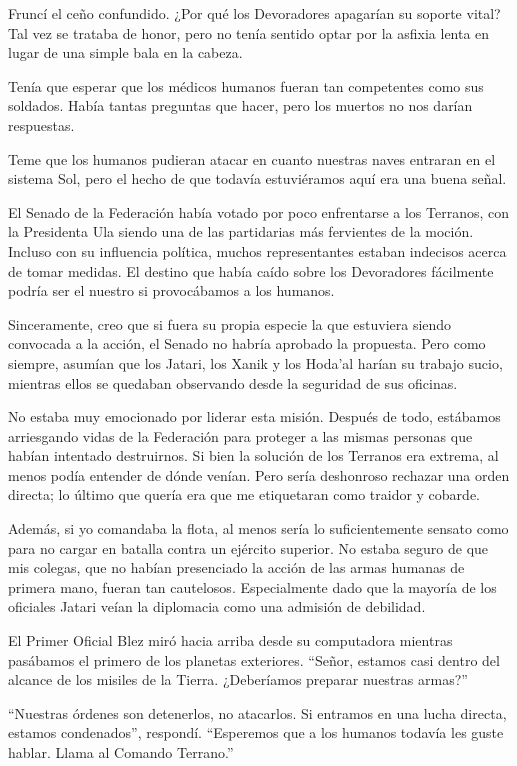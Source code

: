 \documentclass[spanish,12pt,a4paper,oneside,titlepage]{book}
\begin{document}
    Fruncí el ceño confundido. ¿Por qué los Devoradores apagarían su soporte vital? Tal vez se trataba de honor, pero no tenía sentido optar por la asfixia lenta en lugar de una simple bala en la cabeza.

    Tenía que esperar que los médicos humanos fueran tan competentes como sus soldados. Había tantas preguntas que hacer, pero los muertos no nos darían respuestas.

    Teme que los humanos pudieran atacar en cuanto nuestras naves entraran en el sistema Sol, pero el hecho de que todavía estuviéramos aquí era una buena señal.

    El Senado de la Federación había votado por poco enfrentarse a los Terranos, con la Presidenta Ula siendo una de las partidarias más fervientes de la moción. Incluso con su influencia política, muchos representantes estaban indecisos acerca de tomar medidas. El destino que había caído sobre los Devoradores fácilmente podría ser el nuestro si provocábamos a los humanos.

    Sinceramente, creo que si fuera su propia especie la que estuviera siendo convocada a la acción, el Senado no habría aprobado la propuesta. Pero como siempre, asumían que los Jatari, los Xanik y los Hoda’al harían su trabajo sucio, mientras ellos se quedaban observando desde la seguridad de sus oficinas.

    No estaba muy emocionado por liderar esta misión. Después de todo, estábamos arriesgando vidas de la Federación para proteger a las mismas personas que habían intentado destruirnos. Si bien la solución de los Terranos era extrema, al menos podía entender de dónde venían. Pero sería deshonroso rechazar una orden directa; lo último que quería era que me etiquetaran como traidor y cobarde.

    Además, si yo comandaba la flota, al menos sería lo suficientemente sensato como para no cargar en batalla contra un ejército superior. No estaba seguro de que mis colegas, que no habían presenciado la acción de las armas humanas de primera mano, fueran tan cautelosos. Especialmente dado que la mayoría de los oficiales Jatari veían la diplomacia como una admisión de debilidad.

    El Primer Oficial Blez miró hacia arriba desde su computadora mientras pasábamos el primero de los planetas exteriores. “Señor, estamos casi dentro del alcance de los misiles de la Tierra. ¿Deberíamos preparar nuestras armas?”

    “Nuestras órdenes son detenerlos, no atacarlos. Si entramos en una lucha directa, estamos condenados”, respondí. “Esperemos que a los humanos todavía les guste hablar. Llama al Comando Terrano.”
\end{document}
